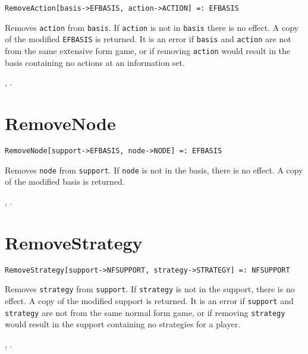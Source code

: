\begin{verbatim}
RemoveAction[basis->EFBASIS, action->ACTION] =: EFBASIS 
\end{verbatim}

\noindent
Removes \verb+action+ from \verb+basis+.  If
\verb+action+ is not in \verb+basis+ there is no
effect.  A copy of the modified \verb+EFBASIS+ is returned.  It is an error
if \verb+basis+ and \verb+action+ are not from the same extensive
form game, or if removing \verb+action+ would result in the basis
containing no actions at an information set.

\seealso {}, .


\section*{RemoveNode}\label{PrimRemoveNode}
\begin{verbatim}
RemoveNode[support->EFBASIS, node->NODE] =: EFBASIS 
\end{verbatim}

\noindent
Removes \verb+node+ from \verb+support+.  If \verb+node+ is not in
the basis, there is no effect.  A copy of the modified basis is
returned.  

\seealso {}, .


\section*{RemoveStrategy}\label{PrimRemoveStrategy}
\begin{verbatim}
RemoveStrategy[support->NFSUPPORT, strategy->STRATEGY] =: NFSUPPORT 
\end{verbatim}

\noindent
Removes \verb+strategy+ from \verb+support+.  If \verb+strategy+ is not in
the support, there is no effect.  A copy of the modified support is
returned.  It is an error if \verb+support+ and \verb+strategy+ are
not from the same normal form game, or if removing \verb+strategy+
would result in the support containing no strategies for a player.

\seealso {},
.


